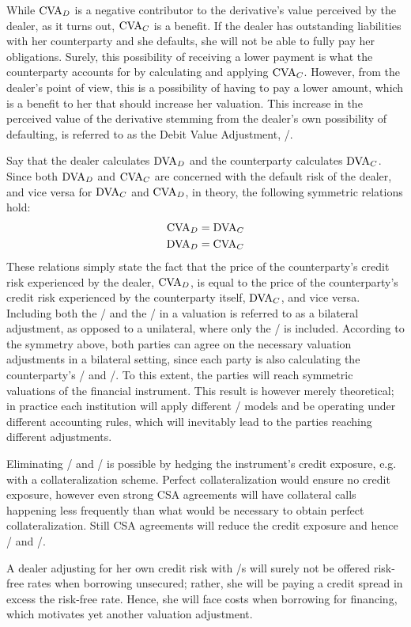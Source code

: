 \documentclass[main.tex]{subfiles}
\begin{document}
        While $\CVA/_{D}$ is a negative contributor to the derivative's value perceived by the dealer, 
        as it turns out, $\CVA/_{C}$ is a benefit.
        If the dealer has outstanding liabilities with her counterparty
        and she defaults, she will not be able to fully pay her obligations. 
        Surely, this possibility of receiving a lower payment is what the counterparty accounts for 
        by calculating and applying $\CVA/_{C}$.
        However, from the dealer's point of view, this is a possibility of having to pay a lower amount,
        which is a benefit to her that should increase her valuation.
        This increase in the perceived value of the derivative
        stemming from the dealer's own possibility of defaulting, 
        is referred to as the Debit Value Adjustment, \DVA/.

        Say that the dealer calculates $\DVA/_{D}$ and the counterparty calculates $\DVA/_{C}$.
        Since both $\DVA/_{D}$ and $\CVA/_{C}$ are concerned with the default risk of the dealer,
        and vice versa for $\DVA/_{C}$ and $\CVA/_{D}$, in theory, the following symmetric relations hold:
            \begin{align*}
                \CVA/_{D} &= \DVA/_{C} \\
                \DVA/_{D} &= \CVA/_{C}
            \end{align*}
        These relations simply state the fact that
        the price of the counterparty's credit risk experienced by the dealer, $\CVA/_{D}$,
        is equal to the price of the counterparty's credit risk 
        experienced by the counterparty itself, $\DVA/_{C}$, and vice versa.
        Including both the \CVA/ and the \DVA/ in a valuation is referred to as a bilateral adjustment,
        as opposed to a unilateral, where only the \CVA/ is included.
        According to the symmetry above,
        both parties can agree on the necessary valuation adjustments in a bilateral setting,
        since each party is also calculating the counterparty's \CVA/ and \DVA/.
        To this extent, the parties will reach symmetric valuations of the financial instrument. 
        This result is however merely theoretical; 
        in practice each institution will apply different \CVA/ models
        and be operating under different accounting rules, 
        which will inevitably lead to the parties reaching different adjustments. 
        
        Eliminating \CVA/ and \DVA/ is possible by hedging the instrument's credit exposure,
        e.g. with a collateralization scheme. 
        Perfect collateralization would ensure no credit exposure,
        however even strong CSA agreements will have collateral calls happening less frequently
        than what would be necessary to obtain perfect collateralization.
        Still CSA agreements will reduce the credit exposure and hence \CVA/ and \DVA/.

        A dealer adjusting for her own credit risk with \DVA/s
        will surely not be offered risk-free rates when borrowing unsecured;
        rather, she will be paying a credit spread in excess the risk-free rate.
        Hence, she will face costs when borrowing for financing,
        which motivates yet another valuation adjustment.
\end{document}
